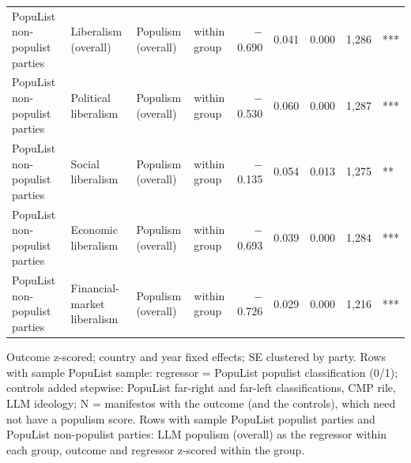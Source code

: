 \begin{table}[ht]
{\begin{tabular}{llllrrrrl}
PopuList non-populist parties & Liberalism (overall) & Populism (overall) & within group & $-$0.690 & 0.041 & 0.000 & 1,286 & *** \\
PopuList non-populist parties & Political liberalism & Populism (overall) & within group & $-$0.530 & 0.060 & 0.000 & 1,287 & *** \\
PopuList non-populist parties & Social liberalism & Populism (overall) & within group & $-$0.135 & 0.054 & 0.013 & 1,275 & ** \\
PopuList non-populist parties & Economic liberalism & Populism (overall) & within group & $-$0.693 & 0.039 & 0.000 & 1,284 & *** \\
PopuList non-populist parties & Financial-market liberalism & Populism (overall) & within group & $-$0.726 & 0.029 & 0.000 & 1,216 & *** \\
\bottomrule
\end{tabular}}
\par\smallskip
\begin{minipage}{\linewidth}\scriptsize Outcome z-scored; country and year fixed effects; SE clustered by party. Rows with sample PopuList sample: regressor = PopuList populist classification (0/1); controls added stepwise: PopuList far-right and far-left classifications, CMP rile, LLM ideology; N = manifestos with the outcome (and the controls), which need not have a populism score. Rows with sample PopuList populist parties and PopuList non-populist parties: LLM populism (overall) as the regressor within each group, outcome and regressor z-scored within the group.\end{minipage}
\end{table}
